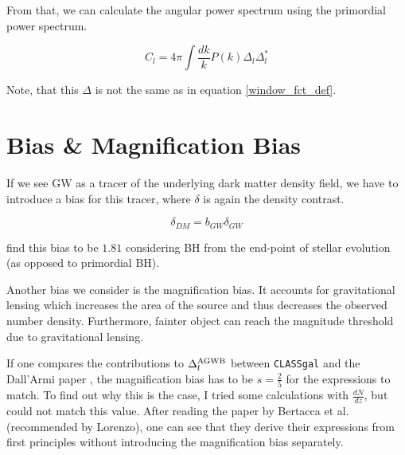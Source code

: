 From that, we can calculate the angular power spectrum using the primordial power 
spectrum.

\begin{equation}
    C_l = 4\pi \int \frac{dk}{k} P(k) \Delta_l \Delta_l^*
\end{equation}

Note, that this $\Delta$ is not the same as in equation \ref{window_fct_def}.


\section{Bias \& Magnification Bias}

If we see GW as a tracer of the underlying dark matter density field, we have to introduce a bias for this tracer, where $\delta$ is again the density contrast.

\begin{equation}
    \delta_{DM}=b_{GW}\delta_{GW}
\end{equation}

\cite{scelfo_gwtimeslss_2018} find this bias to be $1.81$ considering BH from the end-point of stellar evolution (as opposed to primordial BH).

Another bias we consider is the magnification bias. It accounts for gravitational lensing which increases the area of the source and thus decreases the observed number density. Furthermore, fainter object can reach the magnitude threshold due to gravitational lensing.

If one compares the contributions to $\Delta_l^{\rm{AGWB}}$ between {\tt CLASSgal} and the Dall'Armi paper \cite{dallarmi_dipole_2022}, the magnification bias has to be  $s=\frac{2}{5}$ for the expressions to match. To find out why this is the case, I tried some calculations with $\frac{dN}{dz}$, but could not match this value.  After reading the paper by Bertacca et al. \cite{bertacca_projection_2020} (recommended by Lorenzo), one can see that they derive their expressions from 
first principles without introducing the magnification bias separately. 

